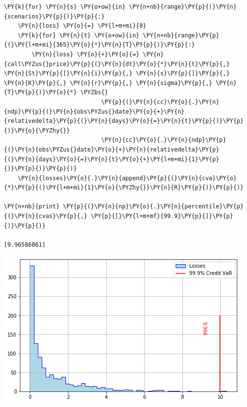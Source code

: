 \begin{Answer}
\begin{codebox}[size=fbox, boxrule=1pt, colback=cellbackground, colframe=cellborder]
\begin{Verbatim}[commandchars=\\\{\}]
\PY{k}{for} \PY{n}{s} \PY{o+ow}{in} \PY{n+nb}{range}\PY{p}{(}\PY{n}{scenarios}\PY{p}{)}\PY{p}{:}
    \PY{n}{loss} \PY{o}{=} \PY{l+m+mi}{0}
    \PY{k}{for} \PY{n}{t} \PY{o+ow}{in} \PY{n+nb}{range}\PY{p}{(}\PY{l+m+mi}{365}\PY{o}{*}\PY{n}{T}\PY{p}{)}\PY{p}{:} 
        \PY{n}{loss} \PY{o}{+}\PY{o}{=} \PY{n}{call\PYZus{}price}\PY{p}{(}\PY{n}{dt}\PY{o}{*}\PY{n}{t}\PY{p}{,} \PY{n}{St}\PY{p}{[}\PY{n}{i}\PY{p}{,} \PY{n}{s}\PY{p}{]}\PY{p}{,} \PY{n}{K}\PY{p}{,} \PY{n}{r}\PY{p}{,} \PY{n}{sigma}\PY{p}{,} \PY{n}{T}\PY{p}{)}\PY{o}{*} \PYZbs{}
                            \PY{p}{(}\PY{n}{cc}\PY{o}{.}\PY{n}{ndp}\PY{p}{(}\PY{n}{obs\PYZus{}date}\PY{o}{+}\PY{n}{relativedelta}\PY{p}{(}\PY{n}{days}\PY{o}{=}\PY{n}{t}\PY{p}{)}\PY{p}{)}\PY{o}{\PYZhy{}}
                            \PY{n}{cc}\PY{o}{.}\PY{n}{ndp}\PY{p}{(}\PY{n}{obs\PYZus{}date}\PY{o}{+}\PY{n}{relativedelta}\PY{p}{(}\PY{n}{days}\PY{o}{=}\PY{n}{t}\PY{o}{+}\PY{l+m+mi}{1}\PY{p}{)}\PY{p}{)}\PY{p}{)}        
    \PY{n}{losses}\PY{o}{.}\PY{n}{append}\PY{p}{(}\PY{n}{cva}\PY{o}{*}\PY{p}{(}\PY{l+m+mi}{1}\PY{o}{\PYZhy{}}\PY{n}{R}\PY{p}{)}\PY{p}{)}
		
\PY{n+nb}{print} \PY{p}{(}\PY{n}{np}\PY{o}{.}\PY{n}{percentile}\PY{p}{(}\PY{n}{cvas}\PY{p}{,} \PY{p}{[}\PY{l+m+mf}{99.9}\PY{p}{]}\PY{p}{)}\PY{p}{)}

[9.96586061]
\end{Verbatim}
\end{codebox}

\includegraphics{figures/cr_var_ex}
\end{Answer}





